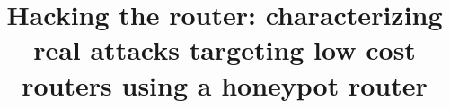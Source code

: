 \documentclass{sig-alternate-br}
\begin{document}
%

\title{Hacking the router: characterizing real attacks targeting low cost routers using a honeypot router}

%
%
%
%
%
\end{document}
